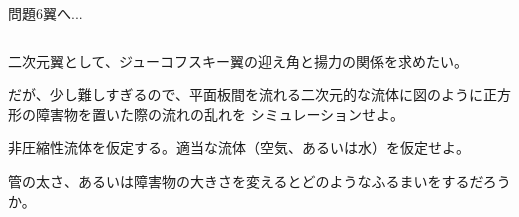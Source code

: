 \documentclass[dvipdfmx]{beamer}
\newenvironment{wideitemize}{\itemize\setlength{\itemsep}{1em}}{\enditemize}
\newenvironment{wideitemize2}{\itemize\setlength{\itemsep}{0.2em}}{\enditemize}
\begin{document}

\begin{frame}{問題6}{翼へ...}
\begin{columns}[t]
\begin{column}{0.7\textwidth}
\begin{wideitemize}
	\item 二次元翼として、ジューコフスキー翼の迎え角と揚力の関係を求めたい。
	\item だが、少し難しすぎるので、平面板間を流れる二次元的な流体に図のように正方形の障害物を置いた際の流れの乱れを
	シミュレーションせよ。
	\begin{wideitemize2}
		\item 非圧縮性流体を仮定する。適当な流体（空気、あるいは水）を仮定せよ。
		\item 管の太さ、あるいは障害物の大きさを変えるとどのようなふるまいをするだろうか。
	\end{wideitemize2}
\end{wideitemize}


\end{column}
\end{columns}
\end{frame}
\end{document}
